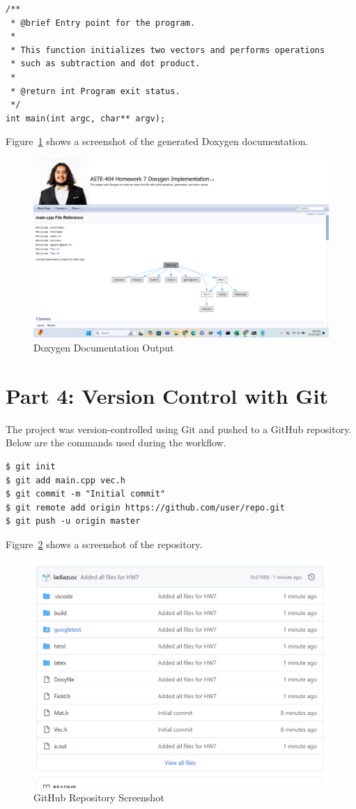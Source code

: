 \documentclass[
]{IEEEtran}
\begin{document}
\begin{lstlisting}[caption={Doxygen Documentation Example}]
/**
 * @brief Entry point for the program.
 *
 * This function initializes two vectors and performs operations
 * such as subtraction and dot product.
 *
 * @return int Program exit status.
 */
int main(int argc, char** argv);
\end{lstlisting}

Figure~\ref{fig:doxygen} shows a screenshot of the generated Doxygen documentation.

\begin{figure}[htbp]
\centering
\includegraphics[width=0.8\linewidth]{doxygen.png} %
\caption{Doxygen Documentation Output}
\label{fig:doxygen}
\end{figure}

\section{Part 4: Version Control with Git}
The project was version-controlled using Git and pushed to a GitHub repository. Below are the commands used during the workflow.

\begin{lstlisting}[caption={Git Commands}]
$ git init
$ git add main.cpp vec.h
$ git commit -m "Initial commit"
$ git remote add origin https://github.com/user/repo.git
$ git push -u origin master
\end{lstlisting}

Figure~\ref{fig:github} shows a screenshot of the repository.

\begin{figure}[htbp]
\centering
\includegraphics[width=0.8\linewidth]{github.png} %
\caption{GitHub Repository Screenshot}
\label{fig:github}
\end{figure}
\end{document}
